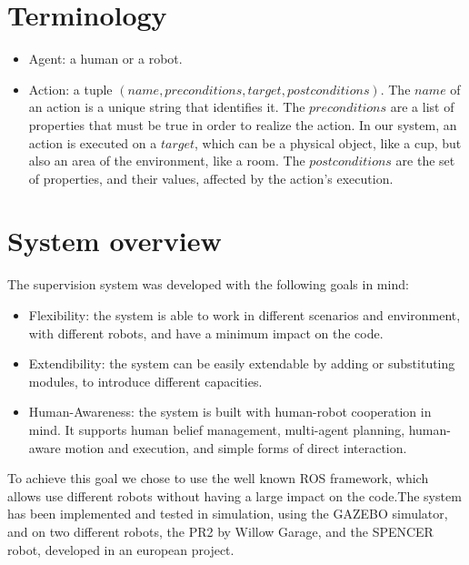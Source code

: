 \section{Terminology}
\begin{itemize}
\item Agent: a human or a robot.
\item Action:  a tuple $(name, preconditions, target, postconditions)$. The $name$ of an action is a unique string that identifies it. The $preconditions$ are a list of properties that must be true in order to realize the action. In our system, an action is executed on a $target$, which can be a physical object, like a cup, but also an area of the environment, like a room. The $postconditions$ are the set of properties, and their values, affected by the action's execution.
\end{itemize}

\section{System overview}
The supervision system was developed with the following goals in mind:
\begin{itemize}
\item Flexibility: the system is able to work in different scenarios and environment, with different robots, and have a minimum impact on the code.  
\item Extendibility: the system can be easily extendable by adding or substituting modules, to introduce different capacities.
\item Human-Awareness: the system is built with human-robot cooperation in mind. It supports human belief management, multi-agent planning, human-aware motion and execution, and simple forms of direct interaction.
\end{itemize}

To achieve this goal we chose to use the well known ROS framework, which allows use different robots without having a large impact on the code.The system has been implemented and tested in simulation, using the GAZEBO simulator, and on two different robots, the PR2 by Willow Garage, and the SPENCER robot, developed in an european project. 

